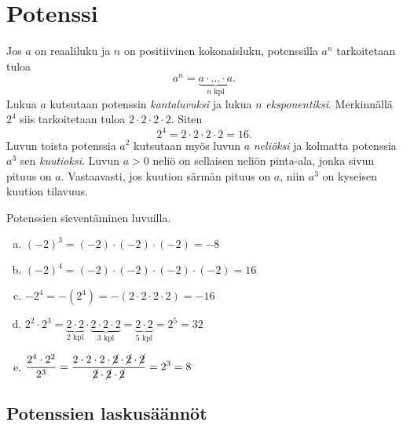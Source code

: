 \chapter{Potenssi}
    
    Jos $a$ on reaaliluku ja $n$ on positiivinen kokonaisluku, potenssilla $a^n$ tarkoitetaan tuloa
    \[
        a^n = \underbrace{a\cdot \ldots \cdot a}_{n\text{ kpl}}. 
    \]
Lukua $a$ kutsutaan potenssin \emph{kantaluvuksi} ja lukua $n$ \emph{eksponentiksi}. Merkinnällä $2^4$ siis tarkoitetaan tuloa $2\cdot 2\cdot 2\cdot 2$. Siten
        \[
            2^4=2\cdot 2\cdot 2\cdot 2=16.
        \]
Luvun toista potenssia $a^2$ kutsutaan myös luvun $a$ \emph{neliöksi} ja kolmatta potenssia $a^3$ sen \emph{kuutioksi}. Luvun $a>0$ neliö on sellaisen neliön pinta-ala, jonka sivun pituus on $a$. Vastaavasti, jos kuution särmän pituus on $a$, niin $a^3$ on kyseisen kuution tilavuus.  
            
    \begin{esimerkki}
        Potenssien sieventäminen luvuilla.
        \begin{enumerate}[a)]
            \item $(-2)^3 = (-2)\cdot (-2)\cdot (-2) = -8$
            \item $(-2)^4 = (-2)\cdot (-2)\cdot (-2)\cdot (-2) = 16$
            \item $-2^4   = -(2^4) = -(2\cdot 2\cdot 2\cdot 2) = -16$
            \item $2^2\cdot 2^3 =
                \underbrace{2\cdot 2}_{\text{$2$ kpl}}\cdot \underbrace{2\cdot
                2\cdot 2}_{\text{$3$ kpl}} = \underbrace{2\cdot 2}_{\text{$5$ kpl}}=2^5 = 32$
            \item $\displaystyle\frac{2^4\cdot 2^2}{2^3} =
                \frac{2\cdot 2\cdot 2\cdot \cancel{2} \cdot \cancel{2}\cdot
                \cancel{2}}{\cancel{2}\cdot \cancel{2}\cdot \cancel{2}} = 2^3 = 8$
        \end{enumerate}
    \end{esimerkki}
    
\section*{Potenssien laskusäännöt}
    
